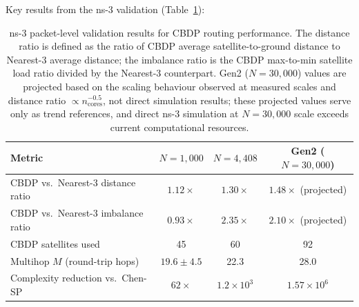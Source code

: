 \documentclass[sn-nature,pdflatex]{sn-jnl}
\begin{document}
Key results from the ns-3 validation (Table~\ref{tab:ns3_validation}):

\begin{table}[htbp]
\centering
\caption{ns-3 packet-level validation results for CBDP routing performance. The distance ratio is defined as the ratio of CBDP average satellite-to-ground distance to Nearest-3 average distance; the imbalance ratio is the CBDP max-to-min satellite load ratio divided by the Nearest-3 counterpart. Gen2 ($N=30,000$) values are projected based on the scaling behaviour observed at measured scales and distance ratio $\propto n_{\text{cores}}^{-0.5}$, not direct simulation results; these projected values serve only as trend references, and direct ns-3 simulation at $N=30,000$ scale exceeds current computational resources.}
\label{tab:ns3_validation}
\begin{tabular}{lccc}
\toprule
\textbf{Metric} & \textbf{$N=1,000$} & \textbf{$N=4,408$} & \textbf{Gen2 ($N=30,000$)} \\
\midrule
CBDP vs.\ Nearest-3 distance ratio & $1.12\times$ & $1.30\times$ & $1.48\times$ (projected) \\
CBDP vs.\ Nearest-3 imbalance ratio & $0.93\times$ & $2.35\times$ & $2.10\times$ (projected) \\
CBDP satellites used & 45 & 60 & 92 \\
Multihop $M$ (round-trip hops) & $19.6 \pm 4.5$ & 22.3 & 28.0 \\
Complexity reduction vs.\ Chen-SP & $62\times$ & $1.2\times10^3$ & $1.57\times10^6$ \\
\bottomrule
\end{tabular}
\end{table}
\end{document}
